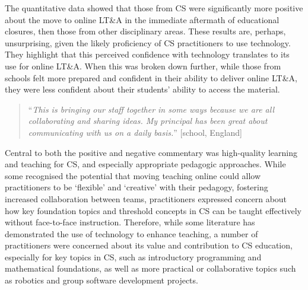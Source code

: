 \documentclass[conference]{IEEEtran}
\begin{document}
The quantitative data showed that those from CS were
significantly more positive about the move to online LT\&A in the
immediate aftermath of educational closures, then those from other
disciplinary areas. These results are, perhaps, unsurprising, given
the likely proficiency of CS practitioners to use
technology. They highlight that this perceived confidence with
technology translates to its use for online LT\&A. When this was
broken down further, while those from schools felt more prepared and
confident in their ability to deliver online LT\&A, they were less
confident about their students’ ability to access the material.


\begin{quotation}
``{\emph{This is bringing our staff together in some ways because we
are all collaborating and sharing ideas. My principal has been great
about communicating with us on a daily basis.}}'' [school, England]
\end{quotation}

Central to both the positive and negative commentary was high-quality
learning and teaching for CS, and especially appropriate
pedagogic approaches. While some recognised the potential that moving
teaching online could allow practitioners to be `flexible' and
`creative' with their pedagogy, fostering increased collaboration between teams,
practitioners expressed concern about
how key foundation topics and threshold concepts in CS
can be taught effectively without face-to-face instruction. Therefore,
while some literature has demonstrated the use of technology to
enhance teaching, a number of practitioners were concerned about its
value and contribution to CS education, especially for key topics in
CS, such as introductory programming and mathematical foundations, as
well as more practical or collaborative topics such as robotics and
group software development projects.
\end{document}
